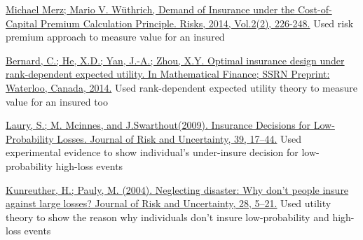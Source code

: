 \documentclass[
]{article}
\begin{document}
\href{https://www.mdpi.com/2227-9091/2/2/226/htm}{Michael Merz; Mario V.
Wüthrich, Demand of Insurance under the Cost-of-Capital Premium
Calculation Principle. Risks, 2014, Vol.2(2), 226-248.} Used risk
premium approach to measure value for an insured

\href{https://www.researchgate.net/publication/228293026_Optimal_Insurance_Design_Under_Rank-Dependent_Expected_Utility}{Bernard,
C.; He, X.D.; Yan, J.-A.; Zhou, X.Y. Optimal insurance design under
rank-dependent expected utility. In Mathematical Finance; SSRN Preprint:
Waterloo, Canada, 2014.} Used rank-dependent expected utility theory to
measure value for an insured too

\href{https://www.researchgate.net/publication/225581818_Insurance_Decisions_for_Low_Probability_Losses}{Laury,
S.; M. Mcinnes, and J.Swarthout(2009). Insurance Decisions for
Low-Probability Losses. Journal of Risk and Uncertainty, 39, 17--44.}
Used experimental evidence to show individual's under-insure decision
for low-probability high-loss events

\href{https://www.jstor.org/stable/41761127}{Kunreuther, H.; Pauly, M.
(2004). Neglecting disaster: Why don't people insure against large
losses? Journal of Risk and Uncertainty, 28, 5--21.} Used utility theory
to show the reason why individuals don't insure low-probability and
high-loss events
\end{document}

